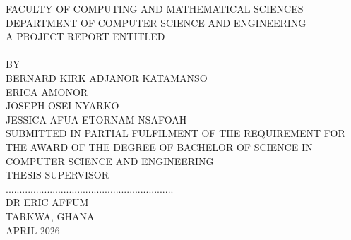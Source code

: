
\begin{titlepage}
	\large
	\begin{center}

		{\scshape \univname\par}\vspace{0cm} %

		{ FACULTY OF  COMPUTING AND MATHEMATICAL SCIENCES}\\[0.02cm] %

		{  DEPARTMENT OF COMPUTER SCIENCE AND ENGINEERING }\\[0.8cm] %

		\vspace{0.2cm}
		{  A PROJECT REPORT ENTITLED }\\[0.1cm] %
		{   \ttitle }\\[1cm] %

		{  BY}\\
		{ BERNARD KIRK ADJANOR KATAMANSO}\\
		{ ERICA AMONOR }\\
		{ JOSEPH OSEI NYARKO}\\
		{ JESSICA AFUA ETORNAM NSAFOAH}\\[1.2cm] %

		{  SUBMITTED IN PARTIAL FULFILMENT OF THE REQUIREMENT FOR THE AWARD OF THE DEGREE OF BACHELOR OF SCIENCE IN COMPUTER SCIENCE AND ENGINEERING }\\[1.2cm] %

		{  THESIS SUPERVISOR}\\[0.3cm] %

		.............................................................\\

		{  DR ERIC AFFUM}\\[0.6cm]
		{  TARKWA, GHANA\\ APRIL 2026}\\%

	\end{center}
\end{titlepage}
